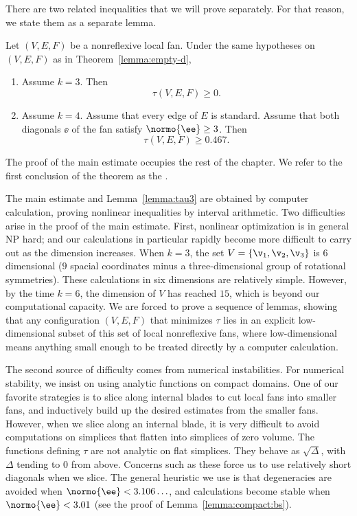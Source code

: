 There are two related inequalities that we will prove separately. For that reason,
we state them as a separate lemma.

\begin{lemma}\label{lemma:tau3}
Let $(V,E,F)$ be a nonreflexive local fan.
Under the same hypotheses on $(V,E,F)$ as in Theorem~\ref{lemma:empty-d}, 
\begin{enumerate}
\item Assume $k=3$. Then
\[\tau(V,E,F)\ge 0.\]
\item Assume $k=4$.  Assume that every edge of $E$ is standard.
Assume that both diagonals $\ee$ of the fan satisfy $\normo{\ee}\ge3$.
Then
\[
\tau(V,E,F)\ge 0.467.
\]
\end{enumerate}
\end{lemma}

The proof of the main estimate occupies the rest of the chapter.
We refer to the first conclusion of the theorem as the .  

The main estimate and Lemma~\ref{lemma:tau3} are obtained by computer
calculation, proving nonlinear inequalities by interval arithmetic.
Two  difficulties
arise in the proof of  the main estimate.  First, nonlinear optimization is
in general NP hard; and our calculations in particular rapidly become
more difficult to carry out as the dimension increases.  When $k=3$,
the set $V=\{\v_1,\v_2,\v_3\}$ is $6$ dimensional ($9$ spacial
coordinates minus a three-dimensional group of rotational symmetries).
These calculations in six dimensions are relatively simple.  However,
by the time $k=6$, the dimension of $V$ has reached $15$, which is 
beyond our computational capacity.  We are forced to prove a sequence of
lemmas, showing that any configuration $(V,E,F)$ that minimizes $\tau$
lies in an explicit low-dimensional subset of this set of local
nonreflexive fans, where low-dimensional means anything small enough
to be treated directly by a computer calculation.

The second source of difficulty comes from numerical instabilities.
For numerical stability, we insist on using analytic functions on
compact domains.  One of our favorite strategies is to slice along
internal blades to cut local fans into smaller fans, and inductively
build up the desired estimates from the smaller fans.  However, when
we slice along an internal blade, it is very difficult to avoid computations on
simplices that flatten into simplices of zero volume.  
The functions defining $\tau$ are not analytic on flat simplices. They behave as
$\sqrt{\Delta}$, with $\Delta$ tending to $0$ from above.  Concerns
such as these force us to use relatively short diagonals when we
slice.  The general heuristic we use is that degeneracies are avoided when
$\normo{\ee}< 3.106\ldots$, and calculations become stable
when $\normo{\ee}<3.01$  (see the proof of
Lemma~\ref{lemma:compact:bs}).

